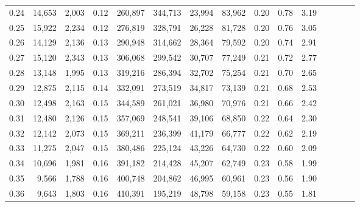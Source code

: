 \begin{tabular}{rrrcrrrrrrrrrrr}
0.24 &  14,653 &  2,003 &                                       0.12 &  260,897 &  344,713 &   23,994 &   83,962 &  0.20 &  0.78 &                         3.19 \\
0.25 &  15,922 &  2,234 &                                       0.12 &  276,819 &  328,791 &   26,228 &   81,728 &  0.20 &  0.76 &                         3.05 \\
0.26 &  14,129 &  2,136 &                                       0.13 &  290,948 &  314,662 &   28,364 &   79,592 &  0.20 &  0.74 &                         2.91 \\
0.27 &  15,120 &  2,343 &                                       0.13 &  306,068 &  299,542 &   30,707 &   77,249 &  0.21 &  0.72 &                         2.77 \\
0.28 &  13,148 &  1,995 &                                       0.13 &  319,216 &  286,394 &   32,702 &   75,254 &  0.21 &  0.70 &                         2.65 \\
0.29 &  12,875 &  2,115 &                                       0.14 &  332,091 &  273,519 &   34,817 &   73,139 &  0.21 &  0.68 &                         2.53 \\
0.30 &  12,498 &  2,163 &                                       0.15 &  344,589 &  261,021 &   36,980 &   70,976 &  0.21 &  0.66 &                         2.42 \\
0.31 &  12,480 &  2,126 &                                       0.15 &  357,069 &  248,541 &   39,106 &   68,850 &  0.22 &  0.64 &                         2.30 \\
0.32 &  12,142 &  2,073 &                                       0.15 &  369,211 &  236,399 &   41,179 &   66,777 &  0.22 &  0.62 &                         2.19 \\
0.33 &  11,275 &  2,047 &                                       0.15 &  380,486 &  225,124 &   43,226 &   64,730 &  0.22 &  0.60 &                         2.09 \\
0.34 &  10,696 &  1,981 &                                       0.16 &  391,182 &  214,428 &   45,207 &   62,749 &  0.23 &  0.58 &                         1.99 \\
0.35 &   9,566 &  1,788 &                                       0.16 &  400,748 &  204,862 &   46,995 &   60,961 &  0.23 &  0.56 &                         1.90 \\
0.36 &   9,643 &  1,803 &                                       0.16 &  410,391 &  195,219 &   48,798 &   59,158 &  0.23 &  0.55 &                         1.81 \\

\end{tabular}

